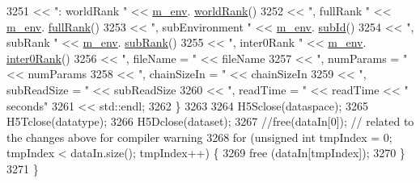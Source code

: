 \begin{DoxyCode}
3251                                         << \textcolor{stringliteral}{": worldRank "}      << \hyperlink{class_q_u_e_s_o_1_1_scalar_sequence_a71618cd6351b29361b437af68447a4c8}{m\_env}.
      \hyperlink{class_q_u_e_s_o_1_1_base_environment_a78b57112bbd0e6dd0e8afec00b40ffa7}{worldRank}()
3252                                         << \textcolor{stringliteral}{", fullRank "}       << \hyperlink{class_q_u_e_s_o_1_1_scalar_sequence_a71618cd6351b29361b437af68447a4c8}{m\_env}.
      \hyperlink{class_q_u_e_s_o_1_1_base_environment_a84a239e42ae443cf71db6e03e8159620}{fullRank}()
3253                                         << \textcolor{stringliteral}{", subEnvironment "} << \hyperlink{class_q_u_e_s_o_1_1_scalar_sequence_a71618cd6351b29361b437af68447a4c8}{m\_env}.
      \hyperlink{class_q_u_e_s_o_1_1_base_environment_a6ae3174897a9b3a4c85fa18da5d4c16f}{subId}()
3254                                         << \textcolor{stringliteral}{", subRank "}        << \hyperlink{class_q_u_e_s_o_1_1_scalar_sequence_a71618cd6351b29361b437af68447a4c8}{m\_env}.
      \hyperlink{class_q_u_e_s_o_1_1_base_environment_a172d52f993f1322ed45aaddf71518dbb}{subRank}()
3255                                         << \textcolor{stringliteral}{", inter0Rank "}     << \hyperlink{class_q_u_e_s_o_1_1_scalar_sequence_a71618cd6351b29361b437af68447a4c8}{m\_env}.
      \hyperlink{class_q_u_e_s_o_1_1_base_environment_ae106b5bb8a80b655b88b3a26b1e7c185}{inter0Rank}()
3256                                         << \textcolor{stringliteral}{", fileName = "}     << fileName
3257                                         << \textcolor{stringliteral}{", numParams = "}    << numParams
3258                                         << \textcolor{stringliteral}{", chainSizeIn = "}  << chainSizeIn
3259                                         << \textcolor{stringliteral}{", subReadSize = "}  << subReadSize
3260                                         << \textcolor{stringliteral}{", readTime = "}     << readTime << \textcolor{stringliteral}{" seconds"}
3261                                         << std::endl;
3262               \}
3263 
3264               H5Sclose(dataspace);
3265               H5Tclose(datatype);
3266               H5Dclose(dataset);
3267               \textcolor{comment}{//free(dataIn[0]); // related to the changes above for compiler warning}
3268               \textcolor{keywordflow}{for} (\textcolor{keywordtype}{unsigned} \textcolor{keywordtype}{int} tmpIndex = 0; tmpIndex < dataIn.size(); tmpIndex++) \{
3269                 free (dataIn[tmpIndex]);
3270               \}
3271             \}

\end{DoxyCode}
